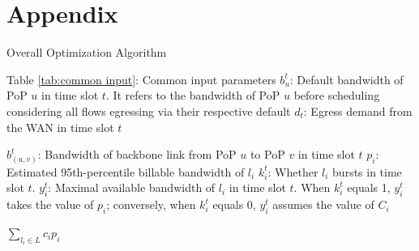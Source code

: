 \section{Appendix}
\begin{algorithm}
	\caption{Overall Optimization Algorithm}
	\label{alg1}
	\begin{algorithmic}
		\renewcommand{\algorithmicrequire}{ \textbf{Inputs:}}
		\REQUIRE 
		\STATE Table \ref{tab:common input}: Common input parameters
            \STATE $b^t_u$: Default bandwidth of PoP $u$ in time slot $t$. It refers to the bandwidth of PoP $u$ before scheduling considering all flows egressing via their respective default {\egress} 
            \STATE $d_t$: Egress demand from the WAN in time slot $t$
		
		\renewcommand{\algorithmicensure}{ \textbf{Outputs:}}
		\ENSURE 
            
            \STATE $b^t_{(u,v)}$: Bandwidth of backbone link from PoP $u$ to PoP $v$ in time slot $t$
            \STATE $p_i$: Estimated 95th-percentile billable bandwidth of {\egress} $l_i$
            \STATE $k_{i}^t$: Whether {\egress} $l_i$ bursts in time slot $t$. 
            \STATE $y_i^t$: Maximal available bandwidth of {\egress} $l_i$ in time slot $t$. When $k_{i}^t$ equals 1, $y_i^t$ takes the value of $p_i$; conversely, when $k_{i}^t$ equals 0, $y_i^t$ assumes the value of $C_i$
		
		\renewcommand{\algorithmicensure}{ \textbf{Minimize:}}
		\ENSURE
		$\sum_{l_i \in L} c_i p_i$


\end{algorithmic}
\end{algorithm}
